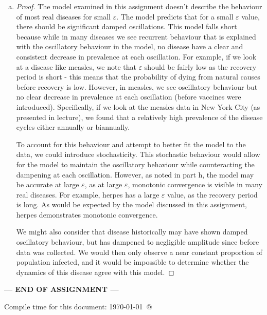 \documentclass[12pt]{article}\usepackage[]{graphicx}\usepackage[]{color}
\begin{document}
\begin{enumerate}[(a)]
\item \SIRk
{\color{blue}\begin{proof}{\color{magenta}
The model examined in this assignment doesn't describe the behaviour of most real diseases for small $\varepsilon$. The model predicts that for a small $\varepsilon$ value, there should be significant damped oscillations. This model falls short because while in many diseases we see recurrent behaviour that is explained with the oscillatory behaviour in the model, no disease have a clear and consistent decrease in prevalence at each oscillation. For example, if we look at a disease like measles, we note that $\varepsilon$ should be fairly low as the recovery period is short - this means that the probability of dying from natural causes before recovery is low. However, in measles, we see oscillatory behaviour but no clear decrease in prevalence at each oscillation (before vaccines were introduced). Specifically, if we look at the measles data in New York City (as presented in lecture), we found that a relatively high prevalence of the disease cycles either annually or biannually. 

To account for this behaviour and attempt to better fit the model to the data, we could introduce stochasticity. This stochastic behaviour would allow for the model to maintain the oscillatory behaviour while counteracting the dampening at each oscillation. However, as noted in part h, the model may be accurate at large $\varepsilon$, as at large $\varepsilon$, monotonic convergence is visible in many real diseases. For example, herpes has a large $\varepsilon$ value, as the recovery period is long. As would be expected by the model discussed in this assignment, herpes demonstrates monotonic convergence.

We might also consider that disease historically may have shown damped oscillatory behaviour, but has dampened to negligible amplitude since before data was collected. We would then only observe a near constant proportion of population infected, and it would be impossible to determine whether the dynamics of this disease agree with this model.
}\end{proof}}


\end{enumerate}




\bigskip\vfill

\centerline{\bf--- END OF ASSIGNMENT ---}

\bigskip
Compile time for this document:
\today\ @ \thistime
\end{document}
